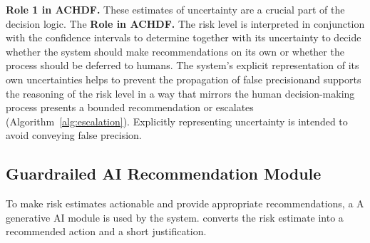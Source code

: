 \documentclass[journal]{IEEEtran}
\theoremstyle{plain}
\theoremstyle{definition}
\providecommand{\DIFaddtex}[1]{{\protect\color{blue} \sf #1}} %
\providecommand{\DIFdeltex}[1]{{\protect\color{red} \scriptsize #1}} %
\providecommand{\DIFaddbegin}{} %
\providecommand{\DIFaddend}{} %
\providecommand{\DIFdelbegin}{} %
\providecommand{\DIFdelend}{} %
\providecommand{\DIFadd}[1]{\texorpdfstring{\DIFaddtex{#1}}{#1}} %
\providecommand{\DIFdel}[1]{\texorpdfstring{\DIFdeltex{#1}}{}} %
\newcommand{\DIFscaledelfig}{0.5}
\newlength{\DIFdelgraphicswidth} %
\newlength{\DIFdelgraphicsheight} %
\newcommand{\DIFaddincludegraphics}[2][]{{\color{blue}\fbox{\DIFOincludegraphics[#1]{#2}}}} %
\newcommand{\DIFdelincludegraphics}[2][]{%
\sbox{\DIFdelgraphicsbox}{\DIFOincludegraphics[#1]{#2}}%
\settoboxwidth{\DIFdelgraphicswidth}{\DIFdelgraphicsbox} %
\settoboxtotalheight{\DIFdelgraphicsheight}{\DIFdelgraphicsbox} %
\scalebox{\DIFscaledelfig}{%
\parbox[b]{\DIFdelgraphicswidth}{\usebox{\DIFdelgraphicsbox}\\[-\baselineskip] \rule{\DIFdelgraphicswidth}{0em}}\llap{\resizebox{\DIFdelgraphicswidth}{\DIFdelgraphicsheight}{%
\setlength{\unitlength}{\DIFdelgraphicswidth}%
\begin{picture}(1,1)%
\thicklines\linethickness{2pt} %
{\color[rgb]{1,0,0}\put(0,0){\framebox(1,1){}}}%
{\color[rgb]{1,0,0}\put(0,0){\line( 1,1){1}}}%
{\color[rgb]{1,0,0}\put(0,1){\line(1,-1){1}}}%
\end{picture}%
}\hspace*{3pt}}} %
} %
\DeclareRobustCommand{\DIFaddbegin}{\DIFOaddbegin \let\includegraphics\DIFaddincludegraphics} %
\DeclareRobustCommand{\DIFaddend}{\DIFOaddend \let\includegraphics\DIFOincludegraphics} %
\DeclareRobustCommand{\DIFdelbegin}{\DIFOdelbegin \let\includegraphics\DIFdelincludegraphics} %
\DeclareRobustCommand{\DIFdelend}{\DIFOaddend \let\includegraphics\DIFOincludegraphics} %
\begin{document}
    \DIFdelbegin \DIFdel{\textbf{Role 1 in ACHDF.}
    These estimates of uncertainty are a crucial part of the decision logic. The }\DIFdelend \DIFaddbegin \DIFadd{\textbf{Role in ACHDF.}
    The }\DIFaddend risk level is interpreted \DIFdelbegin \DIFdel{in conjunction with the confidence intervals to determine }\DIFdelend \DIFaddbegin \DIFadd{together with its uncertainty to decide }\DIFaddend whether the system \DIFdelbegin \DIFdel{should make recommendations on its own or whether the process should be deferred to humans. The system’s explicit representation of its own uncertainties helps to prevent the propagation of false precisionand supports the reasoning of the risk level in a way that mirrors the human decision-making process}\DIFdelend \DIFaddbegin \DIFadd{presents a bounded recommendation or escalates (Algorithm~\ref{alg:escalation}). Explicitly representing uncertainty is intended to avoid conveying false precision}\DIFaddend .

    \subsection{Guardrailed AI Recommendation Module}
    \DIFdelbegin \DIFdel{To make risk estimates actionable and provide appropriate recommendations, a }\DIFdelend \DIFaddbegin \label{sec:guardrails}
    \DIFadd{A }\DIFaddend generative AI module \DIFdelbegin \DIFdel{is used by the system.
}\DIFdelend \DIFaddbegin \DIFadd{converts the risk estimate into a recommended action and a short justification.
}\DIFaddend 
\end{document}
